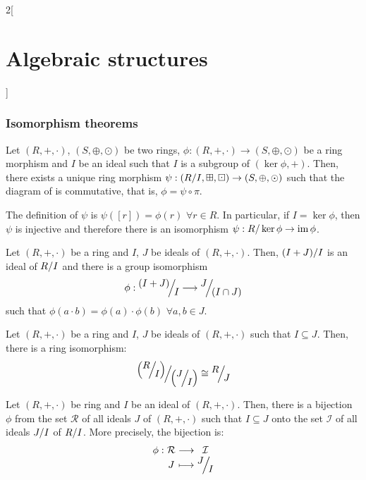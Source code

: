 \documentclass[../../../main_math.tex]{subfiles}
\begin{document}
\begin{multicols}{2}[\section{Algebraic structures}]
  \subsubsection{Isomorphism theorems}
  \begin{theorem}
    Let $(R,+,\cdot)$, $(S,\oplus,\odot)$ be two rings, $\phi:(R,+,\cdot)\rightarrow (S,\oplus,\odot)$ be a ring morphism and $I$ be an ideal such that $I$ is a subgroup of $(\ker\phi,+)$. Then, there exists a unique ring morphism $\psi:\left(\quot{R}{I},\boxplus,\boxdot\right)\rightarrow (S,\oplus,\odot)$ such that the diagram of  is commutative, that is, $\phi=\psi\circ\pi$.
    \begin{center}
      \begin{minipage}{\linewidth}
        \centering
        
        \label{AS:theorem2}
      \end{minipage}
    \end{center}
    The definition of $\psi$ is $\psi([r])=\phi(r)$ $\forall r\in R$.
    In particular, if $I=\ker\phi$, then $\psi$ is injective and therefore there is an isomorphism $\psi:R/\ker\phi\rightarrow\operatorname{im}\phi$.
  \end{theorem}
  \begin{theorem}
    Let $(R,+,\cdot)$ be a ring and $I$, $J$ be ideals of $(R,+,\cdot)$. Then, $\quot{(I+J)}{I}$ is an ideal of $\quot{R}{I}$ and there is a group isomorphism
    $$\phi:\quot{(I+J)}{I}\longrightarrow\quot{J}{(I\cap J)}$$ such that $\phi(a\cdot b)=\phi(a)\cdot\phi(b)$ $\forall a,b\in J$.
  \end{theorem}
  \begin{theorem}
    Let $(R,+,\cdot)$ be a ring and $I$, $J$ be ideals of $(R,+,\cdot)$ such that $I\subseteq J$. Then, there is a ring isomorphism:
    $$\quot{\left(\quot{R}{I}\right)}{\left(\quot{J}{I}\right)}\cong\quot{R}{J}$$
  \end{theorem}
  \begin{theorem}
    Let $(R,+,\cdot)$ be ring and $I$ be an ideal of $(R,+,\cdot)$. Then, there is a bijection $\phi$ from the set $\mathcal{R}$ of all ideals $J$ of $(R,+,\cdot)$ such that $I\subseteq J$ onto the set $\mathcal{I}$ of all ideals $\quot{J}{I}$ of $\quot{R}{I}$. More precisely, the bijection is:
    $$\function{\phi}{\mathcal{R}}{\mathcal{I}}{J}{\displaystyle\quot{J}{I}}$$
  \end{theorem}

\end{multicols}
\end{document}
